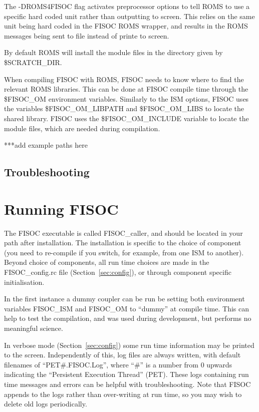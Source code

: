 \documentclass[12pt]{article}
\begin{document}
The -DROMS4FISOC flag activates preprocessor options to tell ROMS to use a 
specific hard coded unit rather than outputting to screen.  This relies on the 
same unit being hard coded in the FISOC ROMS wrapper, and results in the ROMS 
messages being sent to file instead of printe to screen.

By default ROMS will install the module files in the directory given by 
 \$SCRATCH\_DIR.  

When compiling FISOC with ROMS, FISOC needs to know where to 
find the relevant ROMS libraries.  
This can be done at FISOC compile time through the 
\$FISOC\_OM
environment variables.  
Similarly to the ISM options, FISOC uses the variables \$FISOC\_OM\_LIBPATH and
 \$FISOC\_OM\_LIBS to locate the shared library.
FISOC uses the  \$FISOC\_OM\_INCLUDE variable to locate the module files, 
which are needed during compilation.

***add example paths here

\subsection{Troubleshooting}







\section{Running FISOC}
\label{sec:FISOC_SUG}

The FISOC executable is called FISOC\_caller, and should be located in your path after installation. 
The installation is specific to the choice of component (you need to re-compile if you switch, for 
example, from one ISM to another).  
Beyond choice of components, all run time choices are made in the FISOC\_config.rc file
(Section~\ref{sec:config}), 
or through component specific initialisation.

In the first instance a dummy coupler can be run be setting both environment variables FISOC\_ISM and 
FISOC\_OM to ``dummy'' at compile time.  This can help to test the compilation, and was used during development, 
but performs no meaningful science.  

In verbose mode (Section~\ref{sec:config}) some run time information may be printed to the screen.  
Independently of this, log files are always written, 
with default filenames of ``PET\#.FISOC.Log'', where ``\#'' is a number from 0 upwards indicating the 
``Persistent Execution Thread'' (PET). 
These logs containing run time messages and errors can be helpful with troubleshooting.
Note that FISOC appends to the logs rather than over-writing at run time, so you may wish to delete old logs 
periodically. 
\end{document}
